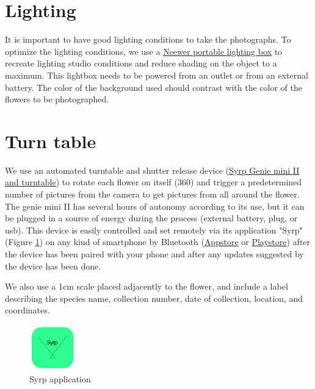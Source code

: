 \documentclass[
]{book}
\theoremstyle{definition}
\theoremstyle{definition}
\theoremstyle{definition}
\theoremstyle{definition}
\theoremstyle{remark}
\begin{document}
\hypertarget{lighting}{%
\section{Lighting}\label{lighting}}

It is important to have good lighting conditions to take the
photographs. To optimize the lighting conditions, we use a \href{https://neewer.com/collections/shooting-tent}{Neewer
portable lighting box} to
recreate lighting studio conditions and reduce shading on the object to
a maximum. This lightbox needs to be powered from an outlet or from an
external battery. The color of the background used should contrast with
the color of the flowers to be photographed.

\hypertarget{turn-table}{%
\section{Turn table}\label{turn-table}}

We use an automated turntable and shutter release device (\href{https://www.bhphotovideo.com/c/product/1486043-REG/syrp_sykit_0043_genie_mini_ii_turntable.html/quick-compare}{Syrp Genie
mini II and
turntable})
to rotate each flower on itself (360) and trigger a predetermined number
of pictures from the camera to get pictures from all around the flower.
The genie mini II has several hours of autonomy according to its use,
but it can be plugged in a source of energy during the process (external
battery, plug, or usb). This device is easily controlled and set
remotely via its application "Syrp" (Figure
\protect\hyperlink{fig:syrp_app}{1}) on
any kind of smartphone by Bluetooth
(\href{https://apps.apple.com/us/app/syrp/id1387335063}{Appstore} or
\href{https://play.google.com/store/apps/details?id=nz.co.syrp.genie2\&hl=fr_CA\&gl=US}{Playstore})
after the device has been paired with your phone and after any updates
suggested by the device has been done.

We also use a 1cm scale placed adjacently to the flower, and include a
label describing the species name, collection number, date of
collection, location, and coordinates.

\begin{figure}
\hypertarget{fig:syrp_app}{%
\centering
\includegraphics[width=2cm,height=\textheight]{Figures/Syrp_app.png}
\caption{Syrp application}\label{fig:syrp_app}
}
\end{figure}
\end{document}
